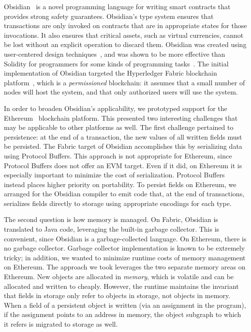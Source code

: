 Obsidian~\cite{Coblenz2020:Obsidian} is a novel programming language for writing smart contracts that provides strong safety guarantees. Obsidian's type system ensures that transactions are only invoked on contracts that are in appropriate states for those invocations. It also ensures that critical assets, such as virtual currencies, cannot be lost without an explicit operation to discard them. Obsidian was created using user-centered design techniques~\cite{Coblenz2021:PLIERS}, and was shown to be more effective than Solidity for programmers for some kinds of programming tasks~\cite{Coblenz2020:Can}. The initial implementation of Obsidian targeted the Hyperledger Fabric blockchain platform~\cite{Fabric}, which is a \emph{permissioned} blockchain: it assumes that a small number of nodes will host the system, and that only authorized users will use the system. 

In order to broaden Obsidian's applicability, we prototyped support for the Ethereum~\cite{Ethereum} blockchain platform. This presented two interesting challenges that may be applicable to other platforms as well. The first challenge pertained to persistence: at the end of a transaction, the new values of all written fields must be persisted. The Fabric target of Obsidian accomplishes this by serializing data using Protocol Buffers. This approach is not appropriate for Ethereum, since Protocol Buffers does not offer an EVM target. Even if it did, on Ethereum it is especially important to minimize the cost of serialization. Protocol Buffers instead places higher priority on portability. To persist fields on Ethereum, we arranged for the Obsidian compiler to emit code that, at the end of transactions, serializes fields directly to storage using appropriate encodings for each type.

The second question is how memory is managed. On Fabric, Obsidian is translated to Java code, leveraging the built-in garbage collector. This is convenient, since Obsidian is a garbage-collected language. On Ethereum, there is no garbage collector. Garbage collector implementation is known to be extremely tricky; in addition, we wanted to minimize runtime costs of memory management on Ethereum. The approach we took leverages the two separate memory areas on Ethereum. New objects are allocated in \textit{memory}, which is volatile and can be allocated and written to cheaply. However, the runtime maintains the invariant that fields in storage only refer to objects in storage, not objects in memory. When a field of a persistent object is written (via an assignment in the program), if the assignment points to an address in memory, the object subgraph to which it refers is migrated to storage as well.


